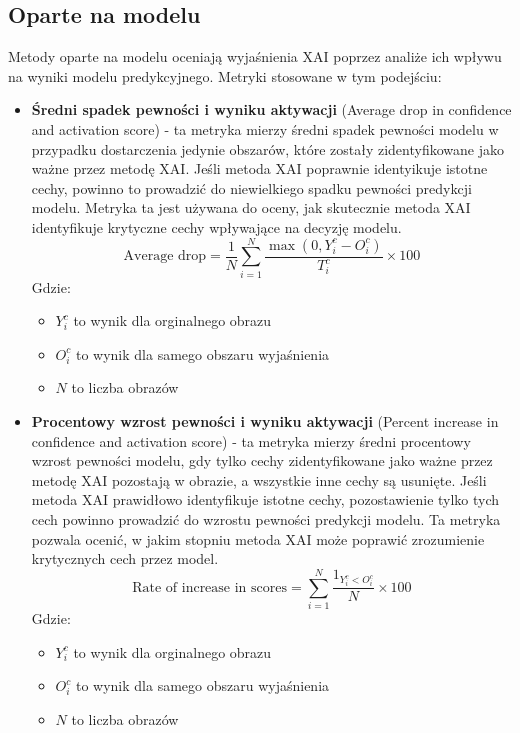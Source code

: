 \subsection*{Oparte na modelu}
Metody oparte na modelu oceniają wyjaśnienia XAI poprzez analiże ich wpływu na wyniki modelu predykcyjnego.
Metryki stosowane w tym podejściu:
\begin{itemize}
	\item \textbf{Średni spadek pewności i wyniku aktywacji} (Average drop in confidence and activation score) - ta metryka mierzy średni spadek pewności modelu w przypadku dostarczenia jedynie obszarów, które zostały zidentyfikowane jako ważne przez metodę XAI.
	      Jeśli metoda XAI poprawnie identyikuje istotne cechy, powinno to prowadzić do niewielkiego spadku pewności predykcji modelu.
	      Metryka ta jest używana do oceny, jak skutecznie metoda XAI identyfikuje krytyczne cechy wpływające na decyzję modelu.
	      \begin{equation}
		      \text{Average drop} = \frac{1}{N} \sum_{i=1}^{N} \frac{\max(0,Y_i^c-O_i^c)}{T_i^c} \times 100
		      \label{eq:myEquation}
	      \end{equation}
	      Gdzie:
	      \begin{itemize}[label=]
		      \item $Y_i^c$ to wynik dla orginalnego obrazu
		      \item $O_i^c$ to wynik dla samego obszaru wyjaśnienia
		      \item $N$ to liczba obrazów
	      \end{itemize}
	\item \textbf{Procentowy wzrost pewności i wyniku aktywacji} (Percent increase in confidence and activation score) - ta metryka mierzy średni procentowy wzrost pewności modelu, gdy tylko cechy zidentyfikowane jako ważne przez metodę XAI pozostają w obrazie, a wszystkie inne cechy są usunięte.
	      Jeśli metoda XAI prawidłowo identyfikuje istotne cechy, pozostawienie tylko tych cech powinno prowadzić do wzrostu pewności predykcji modelu.
	      Ta metryka pozwala ocenić, w jakim stopniu metoda XAI może poprawić zrozumienie krytycznych cech przez model.
	      \begin{equation}
		      \text{Rate of increase in scores} =  \sum_{i=1}^{N} \frac{1_{Y_i^c<O_i^c}}{N} \times 100
		      \label{eq:myEquation}
	      \end{equation}
	      Gdzie:
	      \begin{itemize}[label=]
		      \item $Y_i^c$ to wynik dla orginalnego obrazu
		      \item $O_i^c$ to wynik dla samego obszaru wyjaśnienia
		      \item $N$ to liczba obrazów
	      \end{itemize}
\end{itemize}

